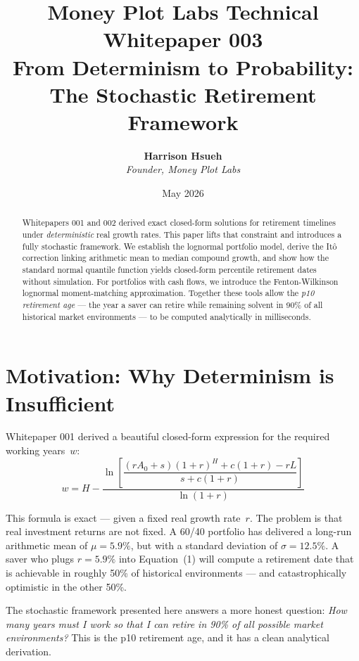 \documentclass[11pt,letterpaper]{article}
\title{\vspace{-20pt}\textbf{\color{mpdark}Money Plot Labs Technical Whitepaper 003 \\
From Determinism to Probability: \\
The Stochastic Retirement Framework}}
\author{\textbf{Harrison Hsueh} \\ \textit{Founder, Money Plot Labs}}
\date{May 2026}
\begin{document}
\maketitle

\begin{abstract}
\vspace{-5pt}
Whitepapers 001 and 002 derived exact closed-form solutions for retirement timelines under \emph{deterministic} real growth rates. This paper lifts that constraint and introduces a fully stochastic framework. We establish the lognormal portfolio model, derive the It\^{o} correction linking arithmetic mean to median compound growth, and show how the standard normal quantile function yields closed-form percentile retirement dates without simulation. For portfolios with cash flows, we introduce the Fenton-Wilkinson lognormal moment-matching approximation. Together these tools allow the \emph{p10 retirement age} --- the year a saver can retire while remaining solvent in 90\% of all historical market environments --- to be computed analytically in milliseconds.
\end{abstract}

\section{Motivation: Why Determinism is Insufficient}

Whitepaper 001 derived a beautiful closed-form expression for the required working years~$w$:
\begin{equation}
w = H - \frac{\ln \!\left[\dfrac{(rA_0 + s)(1+r)^H + c(1+r) - rL}{s + c(1+r)}\right]}{\ln(1+r)}
\end{equation}

This formula is exact --- given a fixed real growth rate~$r$. The problem is that real investment returns are not fixed. A 60/40 portfolio has delivered a long-run arithmetic mean of $\mu = 5.9\%$, but with a standard deviation of $\sigma = 12.5\%$. A saver who plugs $r = 5.9\%$ into Equation~(1) will compute a retirement date that is achievable in roughly 50\% of historical environments --- and catastrophically optimistic in the other 50\%.

The stochastic framework presented here answers a more honest question: \emph{How many years must I work so that I can retire in 90\% of all possible market environments?} This is the p10 retirement age, and it has a clean analytical derivation.
\end{document}

